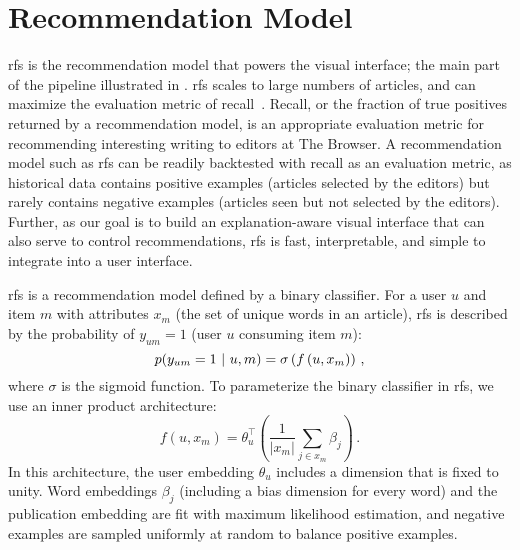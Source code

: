 \section{Recommendation Model}
\acrfull{rfs} is the recommendation model that powers the visual interface; the main part of the pipeline illustrated in . \gls{rfs} scales to large numbers of articles, and can maximize the evaluation metric of recall~\citep{altosaar2020rankfromsets:,altosaar2020probabilistic}. Recall, or the fraction of true positives returned by a recommendation model, is an appropriate evaluation metric for recommending interesting writing to editors at The Browser. A recommendation model such as \gls{rfs} can be readily backtested with recall as an evaluation metric, as historical data contains positive examples (articles selected by the editors) but rarely contains negative examples (articles seen but not selected by the editors). Further, as our goal is to build an explanation-aware visual interface that can also serve to control recommendations, \gls{rfs} is fast, interpretable, and simple to integrate into a user interface.

\gls{rfs} is a recommendation model defined by a binary classifier. For a user $u$ and item $m$ with attributes $x_m$ (the set of unique words in an article), \gls{rfs} is described by the probability of $y_{um} = 1$ (user $u$ consuming item $m$):
$$p(y_{um} = 1 ~\vert~ u, m) = \sigma\left( f \left (u, x_m\right) \right)\, ,$$
where $\sigma$ is the sigmoid function. To parameterize the binary classifier in \gls{rfs}, we use an inner product architecture:
\begin{equation}
\label{eq:inner-product}
  f\left(u, x_m\right) = \theta_u^\top\left(\frac{1}{|x_m|}\sum_{j\in x_m}
  \beta_j\right)\, .
\end{equation}
In this architecture, the user embedding $\theta_u$ includes a dimension that is fixed to unity. Word embeddings $\beta_j$ (including a bias dimension for every word) and the publication embedding are fit with maximum likelihood estimation, and negative examples are sampled uniformly at random to balance positive examples.

